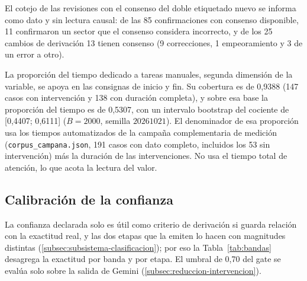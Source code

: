 El cotejo de las revisiones con el consenso del doble etiquetado nuevo se informa como dato y sin lectura causal: de las 85 confirmaciones con consenso disponible, 11 confirmaron un sector que el consenso considera incorrecto, y de los 25 cambios de derivación 13 tienen consenso (9 correcciones, 1 empeoramiento y 3 de un error a otro).

La proporción del tiempo dedicado a tareas manuales, segunda dimensión de la variable, se apoya en las consignas de inicio y fin. Su cobertura es de 0{,}9388 (147 casos con intervención y 138 con duración completa), y sobre esa base la proporción del tiempo es de 0{,}5307, con un intervalo bootstrap del cociente de [0{,}4407; 0{,}6111] (\(B = 2000\), semilla \(20261021\)). El denominador de esa proporción usa los tiempos automatizados de la campaña complementaria de medición (\texttt{corpus\_campana.json}, 191 casos con dato completo, incluidos los 53 sin intervención) más la duración de las intervenciones. No usa el tiempo total de atención, lo que acota la lectura del valor.

\subsection{Calibración de la confianza}
\label{subsec:calibracion}

La confianza declarada solo es útil como criterio de derivación si guarda relación con la exactitud real, y las dos etapas que la emiten lo hacen con magnitudes distintas (\autoref{subsec:subsistema-clasificacion}); por eso la Tabla~\ref{tab:bandas} desagrega la exactitud por banda y por etapa. El umbral de 0,70 del gate se evalúa solo sobre la salida de Gemini (\autoref{subsec:reduccion-intervencion}).

